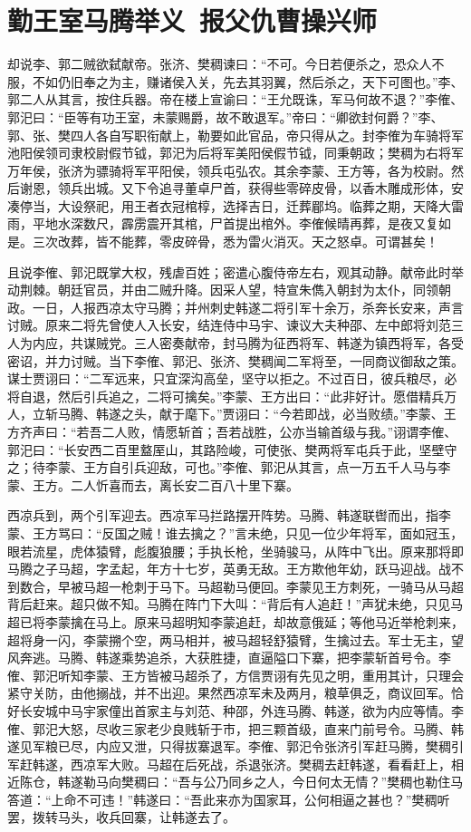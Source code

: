 \chapter{勤王室马腾举义~报父仇曹操兴师}

却说李、郭二贼欲弑献帝。张济、樊稠谏曰：“不可。今日若便杀之，恐众人不服，不如仍旧奉之为主，赚诸侯入关，先去其羽翼，然后杀之，天下可图也。”李、郭二人从其言，按住兵器。帝在楼上宣谕曰：“王允既诛，军马何故不退？”李傕、郭汜曰：“臣等有功王室，未蒙赐爵，故不敢退军。”帝曰：“卿欲封何爵？”李、郭、张、樊四人各自写职衔献上，勒要如此官品，帝只得从之。封李傕为车骑将军池阳侯领司隶校尉假节钺，郭汜为后将军美阳侯假节钺，同秉朝政；樊稠为右将军万年侯，张济为骠骑将军平阳侯，领兵屯弘农。其余李蒙、王方等，各为校尉。然后谢恩，领兵出城。又下令追寻董卓尸首，获得些零碎皮骨，以香木雕成形体，安凑停当，大设祭祀，用王者衣冠棺椁，选择吉日，迁葬郿坞。临葬之期，天降大雷雨，平地水深数尺，霹雳震开其棺，尸首提出棺外。李傕候晴再葬，是夜又复如是。三次改葬，皆不能葬，零皮碎骨，悉为雷火消灭。天之怒卓。可谓甚矣！

且说李傕、郭汜既掌大权，残虐百姓；密遣心腹侍帝左右，观其动静。献帝此时举动荆棘。朝廷官员，并由二贼升降。因采人望，特宣朱儁入朝封为太仆，同领朝政。一日，人报西凉太守马腾；并州刺史韩遂二将引军十余万，杀奔长安来，声言讨贼。原来二将先曾使人入长安，结连侍中马宇、谏议大夫种邵、左中郎将刘范三人为内应，共谋贼党。三人密奏献帝，封马腾为征西将军、韩遂为镇西将军，各受密诏，并力讨贼。当下李傕、郭汜、张济、樊稠闻二军将至，一同商议御敌之策。谋士贾诩曰：“二军远来，只宜深沟高垒，坚守以拒之。不过百日，彼兵粮尽，必将自退，然后引兵追之，二将可擒矣。”李蒙、王方出曰：“此非好计。愿借精兵万人，立斩马腾、韩遂之头，献于麾下。”贾诩曰：“今若即战，必当败绩。”李蒙、王方齐声曰：“若吾二人败，情愿斩首；吾若战胜，公亦当输首级与我。”诩谓李傕、郭汜曰：“长安西二百里盩厔山，其路险峻，可使张、樊两将军屯兵于此，坚壁守之；待李蒙、王方自引兵迎敌，可也。”李傕、郭汜从其言，点一万五千人马与李蒙、王方。二人忻喜而去，离长安二百八十里下寨。

西凉兵到，两个引军迎去。西凉军马拦路摆开阵势。马腾、韩遂联辔而出，指李蒙、王方骂曰：“反国之贼！谁去擒之？”言未绝，只见一位少年将军，面如冠玉，眼若流星，虎体猿臂，彪腹狼腰；手执长枪，坐骑骏马，从阵中飞出。原来那将即马腾之子马超，字孟起，年方十七岁，英勇无敌。王方欺他年幼，跃马迎战。战不到数合，早被马超一枪刺于马下。马超勒马便回。李蒙见王方刺死，一骑马从马超背后赶来。超只做不知。马腾在阵门下大叫：“背后有人追赶！”声犹未绝，只见马超已将李蒙擒在马上。原来马超明知李蒙追赶，却故意俄延；等他马近举枪刺来，超将身一闪，李蒙搠个空，两马相并，被马超轻舒猿臂，生擒过去。军士无主，望风奔逃。马腾、韩遂乘势追杀，大获胜捷，直逼隘口下寨，把李蒙斩首号令。李傕、郭汜听知李蒙、王方皆被马超杀了，方信贾诩有先见之明，重用其计，只理会紧守关防，由他搦战，并不出迎。果然西凉军未及两月，粮草俱乏，商议回军。恰好长安城中马宇家僮出首家主与刘范、种邵，外连马腾、韩遂，欲为内应等情。李傕、郭汜大怒，尽收三家老少良贱斩于市，把三颗首级，直来门前号令。马腾、韩遂见军粮已尽，内应又泄，只得拔寨退军。李傕、郭汜令张济引军赶马腾，樊稠引军赶韩遂，西凉军大败。马超在后死战，杀退张济。樊稠去赶韩遂，看看赶上，相近陈仓，韩遂勒马向樊稠曰：“吾与公乃同乡之人，今日何太无情？”樊稠也勒住马答道：“上命不可违！”韩遂曰：“吾此来亦为国家耳，公何相逼之甚也？”樊稠听罢，拨转马头，收兵回寨，让韩遂去了。


